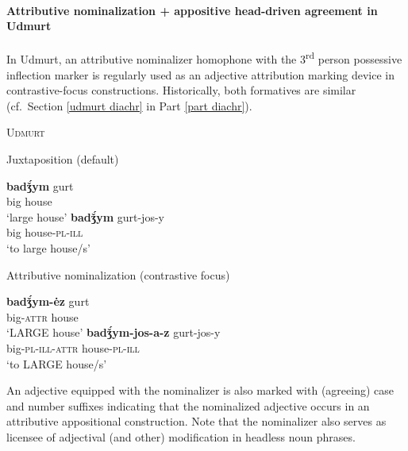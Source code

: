 \paragraph{Attributive nominalization + appositive head-driven agreement in Udmurt} \label{udmurt synchr}
In Udmurt, an attributive nominalizer homophone with the 3\textsuperscript{rd} person possessive inflection marker is regularly used as an adjective attribution marking device in contrastive-focus constructions. Historically, both formatives are similar (cf.~Section \ref{udmurt diachr} in Part \ref{part diachr}).
\begin{exe}
\ex \textsc{Udmurt} \citep{winkler2001}
\begin{xlist}
\ex	Juxtaposition (default)
\begin{xlist}
\ex
\gll	\textbf{badǯ́ym} gurt\\
	big house\\
\glt	‘large house’
\ex	
\gll	\textbf{badǯ́ym} gurt-jos-y\\
	big house-\textsc{pl}-\textsc{ill}\\
\glt	‘to large house/s’
\end{xlist}
\ex	Attributive nominalization (contrastive focus)
\begin{xlist}
\ex
\gll	\textbf{badǯ́ym-ėz} gurt\\
	big-\textsc{attr} house\\
\glt	‘LARGE house’
\ex	
\gll	\textbf{badǯ́ym-jos-a-z} gurt-jos-y\\
	big-\textsc{pl}-\textsc{ill}-\textsc{attr} house-\textsc{pl}-\textsc{ill}\\
\glt	‘to LARGE house/s’
\end{xlist}
\end{xlist}
\end{exe}
An adjective equipped with the nominalizer is also marked with (agreeing) case and number suffixes indicating that the nominalized adjective occurs in an attributive appositional construction. Note that the nominalizer also serves as licensee of adjectival (and other) modification in headless noun phrases.
